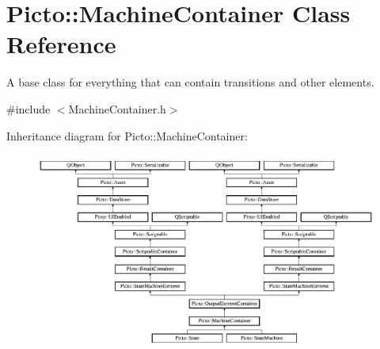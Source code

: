 \hypertarget{class_picto_1_1_machine_container}{\section{Picto\-:\-:Machine\-Container Class Reference}
\label{class_picto_1_1_machine_container}
}


A base class for everything that can contain transitions and other elements.  




{\ttfamily \#include $<$Machine\-Container.\-h$>$}

Inheritance diagram for Picto\-:\-:Machine\-Container\-:\begin{figure}[H]
\begin{center}
\leavevmode
\includegraphics[height=6.484210cm]{class_picto_1_1_machine_container}
\end{center}
\end{figure}
